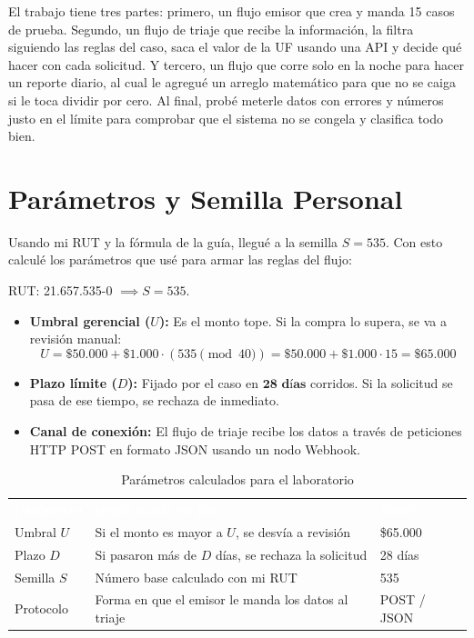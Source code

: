 \documentclass[11pt,letterpaper]{article}
\begin{document}
El trabajo tiene tres partes: primero, un flujo emisor que crea y manda 15 casos de prueba. Segundo, un flujo de triaje que recibe la información, la filtra siguiendo las reglas del caso, saca el valor de la UF usando una API y decide qué hacer con cada solicitud. Y tercero, un flujo que corre solo en la noche para hacer un reporte diario, al cual le agregué un arreglo matemático para que no se caiga si le toca dividir por cero. Al final, probé meterle datos con errores y números justo en el límite para comprobar que el sistema no se congela y clasifica todo bien.

\newpage

\section{Parámetros y Semilla Personal}

Usando mi RUT y la fórmula de la guía, llegué a la semilla $S = 535$. Con esto calculé los parámetros que usé para armar las reglas del flujo:

\begin{semilla}
RUT: 21.657.535-0 $\implies S = 535$.
\end{semilla}

\begin{itemize}[leftmargin=1.5em, itemsep=3pt]
    \item \textbf{Umbral gerencial ($U$):} Es el monto tope. Si la compra lo supera, se va a revisión manual:
    \begin{equation}
    U = \$50.000 + \$1.000 \cdot (535 \pmod{40}) = \$50.000 + \$1.000 \cdot 15 = \mathbf{\$65.000}
    \end{equation}
    \item \textbf{Plazo límite ($D$):} Fijado por el caso en $\mathbf{28 \text{ días}}$ corridos. Si la solicitud se pasa de ese tiempo, se rechaza de inmediato.
    \item \textbf{Canal de conexión:} El flujo de triaje recibe los datos a través de peticiones HTTP POST en formato JSON usando un nodo Webhook.
\end{itemize}

\begin{table}[H]
\centering
\small
\renewcommand{\arraystretch}{1.25}
{
\begin{tabular}{|p{3.5cm} p{8.5cm} l|}
\hline
\rowcolor{usmblue}
\textcolor{white}{\textbf{Parámetro}} & \textcolor{white}{\textbf{Regla usada en n8n}} & \textcolor{white}{\textbf{Valor}} \\
Umbral $U$ & Si el monto es mayor a $U$, se desvía a revisión & \$65.000 \\
Plazo $D$ & Si pasaron más de $D$ días, se rechaza la solicitud & 28 días \\
Semilla $S$ & Número base calculado con mi RUT & 535 \\
Protocolo & Forma en que el emisor le manda los datos al triaje & POST / JSON \\
\hline
\end{tabular}}
\caption{Parámetros calculados para el laboratorio}
\label{tab:parametros}
\end{table}
\end{document}
